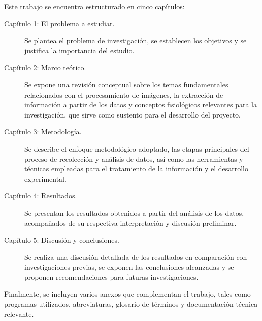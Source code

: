 Este trabajo se encuentra estructurado en cinco capítulos:

\begin{description}
	\item[Capítulo 1: El problema a estudiar.] Se plantea el problema de investigación, se establecen los objetivos y se justifica la importancia del estudio.
	
	\item[Capítulo 2: Marco teórico.] Se expone una revisión conceptual sobre los temas fundamentales relacionados con el procesamiento de imágenes, la extracción de información a partir de los datos y conceptos fisiológicos relevantes para la investigación, que sirve como sustento para el desarrollo del proyecto.
	
	\item[Capítulo 3: Metodología.] Se describe el enfoque metodológico adoptado, las etapas principales del proceso de recolección y análisis de datos, así como las herramientas y técnicas empleadas para el tratamiento de la información y el desarrollo experimental.
	
	\item[Capítulo 4: Resultados.] Se presentan los resultados obtenidos a partir del análisis de los datos, acompañados de su respectiva interpretación y discusión preliminar.
	
	\item[Capítulo 5: Discusión y conclusiones.] Se realiza una discusión detallada de los resultados en comparación con investigaciones previas, se exponen las conclusiones alcanzadas y se proponen recomendaciones para futuras investigaciones.
\end{description}

Finalmente, se incluyen varios anexos que complementan el trabajo, tales como programas utilizados, abreviaturas, glosario de términos y documentación técnica relevante.